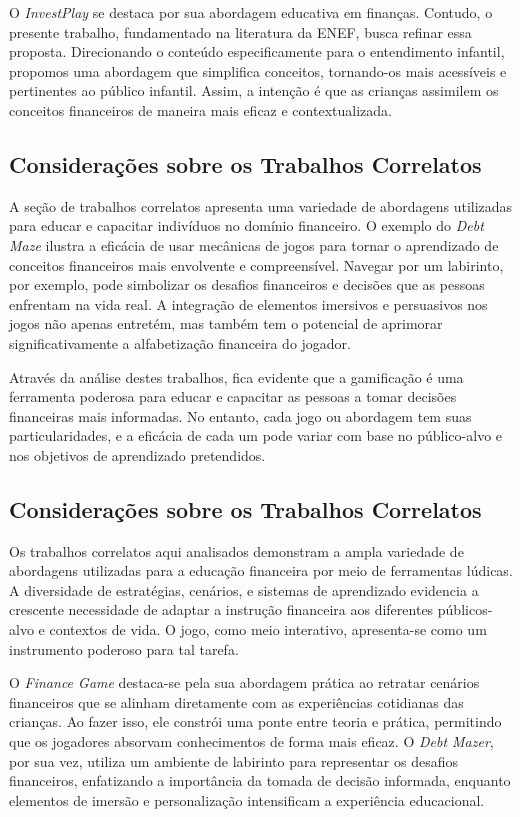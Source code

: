             O \textit{InvestPlay}\cite{santos2020investplay} se destaca por sua abordagem educativa em finanças. Contudo, o presente trabalho, fundamentado na literatura da ENEF, busca refinar essa proposta. Direcionando o conteúdo especificamente para o entendimento infantil, propomos uma abordagem que simplifica conceitos, tornando-os mais acessíveis e pertinentes ao público infantil. Assim, a intenção é que as crianças assimilem os conceitos financeiros de maneira mais eficaz e contextualizada.

        \subsection{Considerações sobre os Trabalhos Correlatos}

            A seção de trabalhos correlatos apresenta uma variedade de abordagens utilizadas para educar e capacitar indivíduos no domínio financeiro. O exemplo do \textit{Debt Maze} ilustra a eficácia de usar mecânicas de jogos para tornar o aprendizado de conceitos financeiros mais envolvente e compreensível. Navegar por um labirinto, por exemplo, pode simbolizar os desafios financeiros e decisões que as pessoas enfrentam na vida real. A integração de elementos imersivos e persuasivos nos jogos não apenas entretém, mas também tem o potencial de aprimorar significativamente a alfabetização financeira do jogador.

Através da análise destes trabalhos, fica evidente que a gamificação é uma ferramenta poderosa para educar e capacitar as pessoas a tomar decisões financeiras mais informadas. No entanto, cada jogo ou abordagem tem suas particularidades, e a eficácia de cada um pode variar com base no público-alvo e nos objetivos de aprendizado pretendidos.








        \subsection{Considerações sobre os Trabalhos Correlatos}







Os trabalhos correlatos aqui analisados demonstram a ampla variedade de abordagens utilizadas para a educação financeira por meio de ferramentas lúdicas. A diversidade de estratégias, cenários, e sistemas de aprendizado evidencia a crescente necessidade de adaptar a instrução financeira aos diferentes públicos-alvo e contextos de vida. O jogo, como meio interativo, apresenta-se como um instrumento poderoso para tal tarefa.

O \textit{Finance Game} destaca-se pela sua abordagem prática ao retratar cenários financeiros que se alinham diretamente com as experiências cotidianas das crianças. Ao fazer isso, ele constrói uma ponte entre teoria e prática, permitindo que os jogadores absorvam conhecimentos de forma mais eficaz. O \textit{Debt Mazer}, por sua vez, utiliza um ambiente de labirinto para representar os desafios financeiros, enfatizando a importância da tomada de decisão informada, enquanto elementos de imersão e personalização intensificam a experiência educacional.